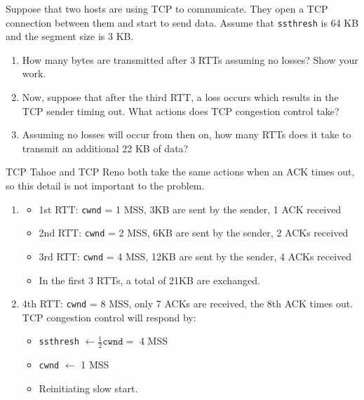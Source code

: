 \documentclass{report}
\begin{document}
\clearpage
\begin{problem}

Suppose that two hosts are using TCP to communicate. They open a TCP connection
between them and start to send data. Assume that \texttt{ssthresh} is 64 KB and
the segment size is 3 KB.
\begin{enumerate}
	\item How many bytes are transmitted after 3 RTTs assuming no losses? Show
        your work.
	\item Now, suppose that after the third RTT, a loss occurs which results in
        the TCP sender timing out. What actions does TCP congestion control take?
	\item Assuming no losses will occur from then on, how many RTTs does it take
        to transmit an additional 22 KB of data?
\end{enumerate}

\begin{answer}{35em}
  TCP Tahoe and TCP Reno both take the same actions when an ACK times out, so
  this detail is not important to the problem.
  \begin{enumerate}
    \item 
      \begin{itemize}
        \item 1st RTT: \texttt{cwnd} = 1 MSS, 3KB are sent by the sender, 1 ACK received
        \item 2nd RTT: \texttt{cwnd} = 2 MSS, 6KB are sent by the sender, 2 ACKs received
        \item 3rd RTT: \texttt{cwnd} = 4 MSS, 12KB are sent by the sender, 4 ACKs received
        \item In the first 3 RTTs, a total of 21KB are exchanged.
      \end{itemize}

    \item 4th RTT: \texttt{cwnd} = 8 MSS, only 7 ACKs are received, the 8th ACK
          times out.\\
          TCP congestion control will respond by:
          \begin{itemize}
            \item \texttt{ssthresh} $\gets \frac{1}{2} \mathtt{cwnd} =$ 4 MSS
            \item \texttt{cwnd} $\gets$ 1 MSS
            \item Reinitiating slow start.
          \end{itemize}


\end{enumerate}
\end{answer}
\end{problem}
\end{document}
